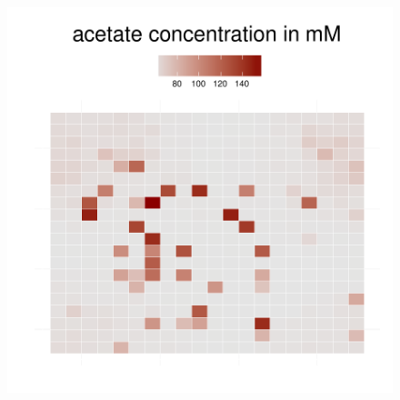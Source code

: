 \begin{figure}[h!]
{\begin{minipage}[t]{0.3\textwidth}
  \end{minipage}
  \begin{minipage}[t]{0.3\textwidth}
    \includegraphics[width=\textwidth]{../results/ecoli_20x20_aerob_seed55_ace50.pdf}
  \end{minipage}
  }
\end{figure}

